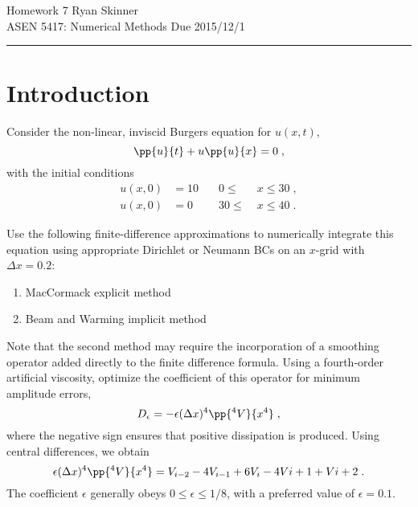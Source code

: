 \documentclass[11pt]{article}
\begin{document}
\pagestyle{fancyplain}
\lhead{}
\chead{}
\rhead{}
\cfoot{\hrule \thepage}

\noindent
{\Large Homework 7}
\hfill
{\large Ryan Skinner}
\\[0.5ex]
{\large ASEN 5417: Numerical Methods}
\hfill
{\large Due 2015/12/1}\\
\hrule
\vspace{6pt}

\section{Introduction} %

Consider the non-linear, inviscid Burgers equation for $u(x,t)$,
\begin{equation}
\pp{u}{t} + u \pp{u}{x} = 0
\;,
\end{equation}
with the initial conditions
\begin{equation}
\begin{aligned}
u(x,0) &= 10 &\quad 0  \le\; &x \le 30 \;, \\
u(x,0) &= 0  &\quad 30 \le\; &x \le 40 \;.
\end{aligned}
\end{equation}

Use the following finite-difference approximations to numerically integrate this equation using appropriate Dirichlet or Neumann BCs on an $x$-grid with $\Delta x = 0.2$:
\begin{enumerate}
\item MacCormack explicit method
\item Beam and Warming implicit method
\end{enumerate}

Note that the second method  may require the incorporation of a smoothing operator added directly to the finite difference formula. Using a fourth-order artificial viscosity, optimize the coefficient of this operator for minimum amplitude errors,
\begin{equation}
D_\epsilon = - \epsilon(\Delta x)^4 \pp{^4 V}{x^4}
\;,
\end{equation}
where the negative sign ensures that positive dissipation is produced. Using central differences, we obtain
\begin{equation}
\epsilon(\Delta x)^4 \pp{^4 V}{x^4} = V_{i-2} -4V_{i-1} +6V_i -4V{i+1} +V{i+2}
\;.
\end{equation}
The coefficient $\epsilon$ generally obeys $0 \le \epsilon \le 1/8$, with a preferred value of $\epsilon = 0.1$.
\end{document}
